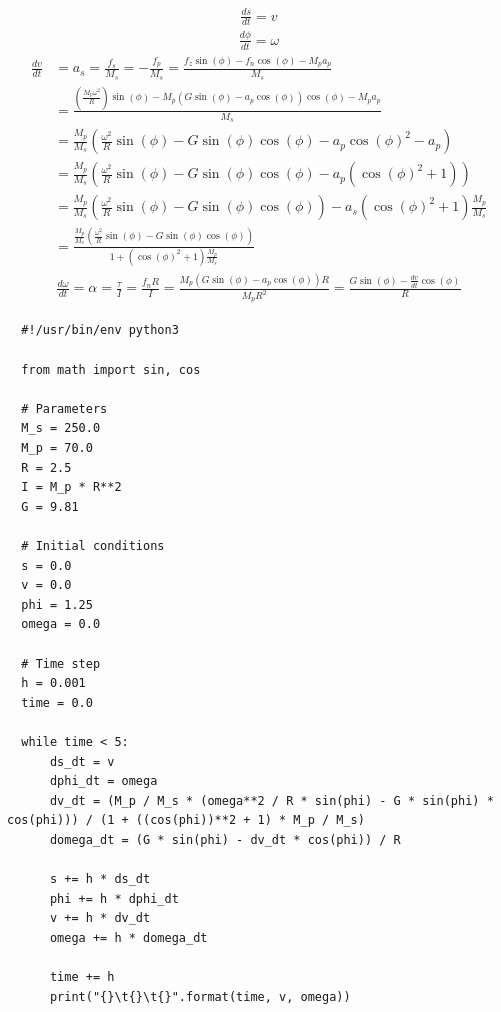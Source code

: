 \documentclass[10pt,a4paper]{article}
\begin{document}
\begin{align*}
  \frac{d s}{d t} = v
\end{align*}
\begin{align*}
  \frac{d \phi}{d t} = \omega
\end{align*}
\begin{align*}
  \frac{d v}{d t} & = a_{s} = \frac{f_{s}}{M_{s}} = -\frac{f_{p}}{M_{s}} = \frac{f_{z}\sin(\phi) - f_{n} \cos(\phi) - M_{p}a_{p}}{M_{s}}\\
                  & = \frac{\left( \frac{M_{p}\omega^{2}}{R} \right)\sin(\phi) - M_{p} (G\sin(\phi) - a_{p} \cos(\phi)) \cos(\phi) - M_{p}a_{p}}{M_{s}}\\
                  & = \frac{M_{p}}{M_{s}} \left( \frac{\omega^{2}}{R} \sin(\phi) - G\sin(\phi)\cos(\phi) - a_{p} \cos(\phi)^{2} - a_{p}\right)\\
                  & = \frac{M_{p}}{M_{s}} \left( \frac{\omega^{2}}{R} \sin(\phi) - G\sin(\phi)\cos(\phi) - a_{p} (\cos(\phi)^{2} + 1)\right)\\
                  & = \frac{M_{p}}{M_{s}} \left( \frac{\omega^{2}}{R} \sin(\phi) - G\sin(\phi)\cos(\phi)\right) - a_{s} (\cos(\phi)^{2} + 1) \frac{M_{p}}{M_{s}}\\
                  & = \frac{\frac{M_{p}}{M_{s}} \left( \frac{\omega^{2}}{R} \sin(\phi) - G\sin(\phi)\cos(\phi)\right)}{1 + (\cos(\phi)^{2} + 1) \frac{M_{p}}{M_{s}}}
\end{align*}
\begin{align*}
  \frac{d \omega}{d t} = \alpha = \frac{\tau}{I} = \frac{f_{n}R}{I} = \frac{M_{p}(G \sin(\phi) - a_{p} \cos(\phi))R}{M_{p}R^{2}} = \frac{G \sin(\phi) - \frac{d v}{d t} \cos(\phi)}{R}
\end{align*}

\begin{verbatim}
  #!/usr/bin/env python3

  from math import sin, cos

  # Parameters
  M_s = 250.0
  M_p = 70.0
  R = 2.5
  I = M_p * R**2
  G = 9.81

  # Initial conditions
  s = 0.0
  v = 0.0
  phi = 1.25
  omega = 0.0

  # Time step
  h = 0.001
  time = 0.0

  while time < 5:
      ds_dt = v
      dphi_dt = omega
      dv_dt = (M_p / M_s * (omega**2 / R * sin(phi) - G * sin(phi) * cos(phi))) / (1 + ((cos(phi))**2 + 1) * M_p / M_s)
      domega_dt = (G * sin(phi) - dv_dt * cos(phi)) / R

      s += h * ds_dt
      phi += h * dphi_dt
      v += h * dv_dt
      omega += h * domega_dt

      time += h
      print("{}\t{}\t{}".format(time, v, omega))
\end{verbatim}
\end{document}
